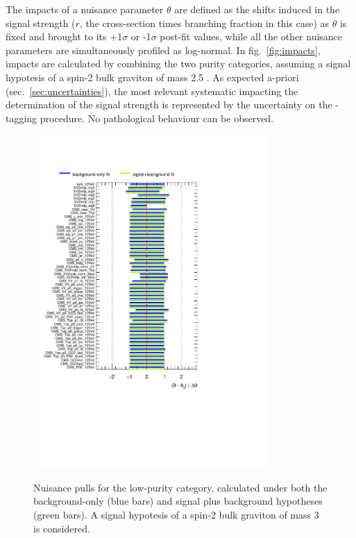 \noindent The impacts of a nuisance parameter $\theta$ are defined as the shifts induced in the signal strength ($r$, the cross-section times branching fraction in this case) as $\theta$ is fixed and brought to its +1$\sigma$ or -1$\sigma$ post-fit values, while all the other nuisance parameters are simultaneously profiled as log-normal. In fig.~\ref{fig:impacts}, impacts are calculated by combining the two purity categories, assuming a signal hypotesis of a spin-2 bulk graviton of mass 2.5 \TeV. As expected a-priori (sec.~\ref{sec:uncertainties}), the most relevant systematic impacting the determination of the signal strength is represented by the uncertainty on the \V-tagging procedure. No pathological behaviour can be observed. %

\begin{figure}[!h]
   \caption{Nuisance pulls for the low-purity category, calculated under both the background-only (blue bars) and signal plus background hypotheses (green bars). A signal hypotesis of a spin-2 bulk graviton of mass 3 \TeV is considered.}
 \begin{center}
   \includegraphics[width=0.8\textwidth]{pulls_VZ_data_1fb/pulls_XZZInv_lp3000.pdf}
   \label{fig:pulls_lp}
 \end{center}
\end{figure}

